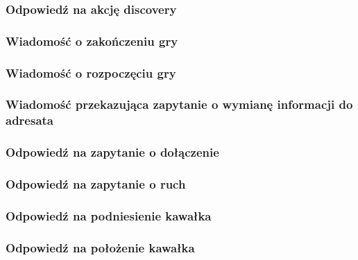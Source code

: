 \documentclass[Dokumentacja.tex]{subfiles}
\begin{document}
\subsubsection{Odpowiedź na akcję discovery}


\subsubsection{Wiadomość o zakończeniu gry}


\subsubsection{Wiadomość o rozpoczęciu gry}


\subsubsection{Wiadomość przekazująca zapytanie o wymianę informacji do adresata}


\subsubsection{Odpowiedź na zapytanie o dołączenie}


\subsubsection{Odpowiedź na zapytanie o ruch}


\subsubsection{Odpowiedź na podniesienie kawałka}


\subsubsection{Odpowiedź na położenie kawałka}

\end{document}
